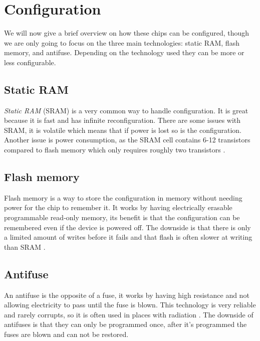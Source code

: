 \section{Configuration}
We will now give a brief overview on how these chips can be configured, though
we are only going to focus on the three main technologies: static RAM, flash
memory, and antifuse. Depending on the technology used they can be more or less
configurable.

\subsection{Static RAM}
\textit{Static RAM} (SRAM) is a very common way to handle configuration. It is great
because it is fast and has infinite reconfiguration. There are some issues with SRAM,
it is volatile which means that if power is lost so is the configuration.
Another issue is power consumption, as the SRAM cell contains 6-12 transistors
compared to flash memory which only requires roughly two transistors
\citep{HideharuAmano8}.

\subsection{Flash memory}
Flash memory is a way to store the configuration in memory without needing
power for the chip to remember it. It works by having electrically erasable
programmable read-only memory, its benefit is that the configuration can be
remembered even if the device is powered off. The downside is that there is only
a limited amount of writes before it fails and that flash is often slower at
writing than SRAM \citep{M.MorrisMano3}.

\subsection{Antifuse}
An antifuse is the opposite of a fuse, it works by having high resistance and
not allowing electricity to pass until the fuse is blown. This technology is
very reliable and rarely corrupts, so it is often used in places with
radiation \citep[Ch. 1]{ScottHauckAndreDeHon5}. The downside of antifuses is that they can only be
programmed once, after it's programmed the fuses are blown and can not be
restored.
